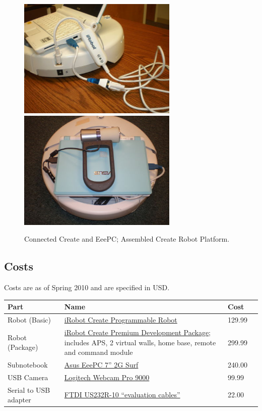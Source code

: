 \begin{figure}[!h]
\centerline{
\mbox{\includegraphics[width=3.00in]{figures/2_cable_setup.jpg}}
\mbox{\includegraphics[width=3.00in]{figures/2_cable_store.jpg}}
}
\caption{Connected Create and EeePC; Assembled Create Robot Platform.}
\label{fig:2_cable_setup}
\end{figure}

\newpage

\subsection{Costs}

Costs are as of Spring 2010 and are specified in USD.

\begin{center}
    \begin{tabular}{ | p{3.0cm} | p{10cm} | l | l |}
    \hline
    \textbf{Part} & \textbf{Name} & \textbf{Cost} \\ \hline
    Robot (Basic) & \href{www.irobot.com}{iRobot Create Programmable Robot} & 129.99 \\ \hline
    Robot (Package) & \href{www.irobot.com}{iRobot Create Premium Development Package}; includes APS, 2 virtual walls, home base, remote and command module & 299.99 \\ \hline
    Subnotebook & \href{eeepc.asus.com}{Asus EeePC 7'' 2G Surf} & 240.00 \\ \hline
    USB Camera & \href{www.logitech.com}{Logitech Webcam Pro 9000} & 99.99 \\ \hline
    Serial to USB adapter & \href{www.digikey.com}{FTDI US232R-10 ``evaluation cables''} & 22.00 \\ \hline
    \end{tabular}
\end{center}


